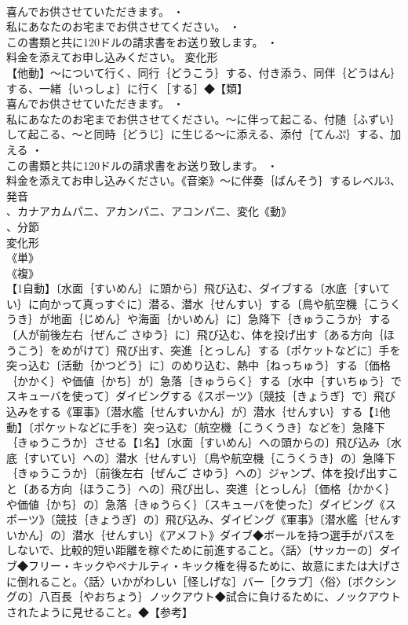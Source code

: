 \documentclass[8pt]{extreport}
\begin{document}
\begin{CJK}{UTF8}{min}
\\	喜んでお供させていただきます。 ・
\\	私にあなたのお宅までお供させてください。 ・
\\	この書類と共に120ドルの請求書をお送り致します。 ・
\\	料金を添えてお申し込みください。	変化形 
\\	【他動】～について行く、同行｛どうこう｝する、付き添う、同伴｛どうはん｝する、一緒｛いっしょ｝に行く［する］◆【類】
\\	喜んでお供させていただきます。 ・
\\	私にあなたのお宅までお供させてください。～に伴って起こる、付随｛ふずい｝して起こる、～と同時｛どうじ｝に生じる～に添える、添付｛てんぷ｝する、加える ・
\\	この書類と共に120ドルの請求書をお送り致します。 ・
\\	料金を添えてお申し込みください。《音楽》～に伴奏｛ばんそう｝するレベル3、発音
\\	、カナアカムパニ、アカンパニ、アコンパニ、変化《動》
\\	、分節
\\	変化形 
\\	《単》
\\	《複》
\\	【1自動】〔水面｛すいめん｝に頭から〕飛び込む、ダイブする〔水底｛すいてい｝に向かって真っすぐに〕潜る、潜水｛せんすい｝する〔鳥や航空機｛こうくうき｝が地面｛じめん｝や海面｛かいめん｝に〕急降下｛きゅうこうか｝する〔人が前後左右｛ぜんご さゆう｝に〕飛び込む、体を投げ出す〔ある方向｛ほうこう｝をめがけて〕飛び出す、突進｛とっしん｝する〔ポケットなどに〕手を突っ込む〔活動｛かつどう｝に〕のめり込む、熱中｛ねっちゅう｝する〔価格｛かかく｝や価値｛かち｝が〕急落｛きゅうらく｝する〔水中｛すいちゅう｝でスキューバを使って〕ダイビングする《スポーツ》〔競技｛きょうぎ｝で〕飛び込みをする《軍事》〔潜水艦｛せんすいかん｝が〕潜水｛せんすい｝する【1他動】〔ポケットなどに手を〕突っ込む〔航空機｛こうくうき｝などを〕急降下｛きゅうこうか｝させる【1名】〔水面｛すいめん｝への頭からの〕飛び込み〔水底｛すいてい｝への〕潜水｛せんすい｝〔鳥や航空機｛こうくうき｝の〕急降下｛きゅうこうか｝〔前後左右｛ぜんご さゆう｝への〕ジャンプ、体を投げ出すこと〔ある方向｛ほうこう｝への〕飛び出し、突進｛とっしん｝〔価格｛かかく｝や価値｛かち｝の〕急落｛きゅうらく｝〔スキューバを使った〕ダイビング《スポーツ》〔競技｛きょうぎ｝の〕飛び込み、ダイビング《軍事》〔潜水艦｛せんすいかん｝の〕潜水｛せんすい｝《アメフト》ダイブ◆ボールを持つ選手がパスをしないで、比較的短い距離を稼ぐために前進すること。〈話〉〔サッカーの〕ダイブ◆フリー・キックやペナルティ・キック権を得るために、故意にまたは大げさに倒れること。〈話〉いかがわしい［怪しげな］バー［クラブ］〈俗〉〔ボクシングの〕八百長｛やおちょう｝ノックアウト◆試合に負けるために、ノックアウトされたように見せること。◆【参考】

\end{CJK}
\end{document}

